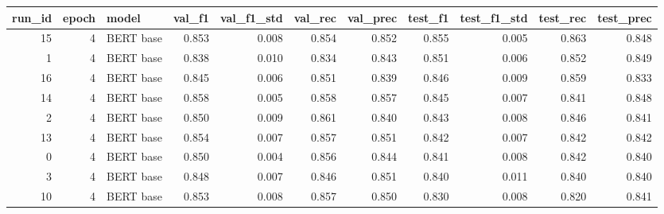 \begin{tabular}{rrlrrrrrrrr}
\toprule
 run\_id &  epoch &     model &  val\_f1 &  val\_f1\_std &  val\_rec &  val\_prec &  test\_f1 &  test\_f1\_std &  test\_rec &  test\_prec \\
\midrule
     15 &      4 & BERT base &   0.853 &       0.008 &    0.854 &     0.852 &    0.855 &        0.005 &     0.863 &      0.848 \\
      1 &      4 & BERT base &   0.838 &       0.010 &    0.834 &     0.843 &    0.851 &        0.006 &     0.852 &      0.849 \\
     16 &      4 & BERT base &   0.845 &       0.006 &    0.851 &     0.839 &    0.846 &        0.009 &     0.859 &      0.833 \\
     14 &      4 & BERT base &   0.858 &       0.005 &    0.858 &     0.857 &    0.845 &        0.007 &     0.841 &      0.848 \\
      2 &      4 & BERT base &   0.850 &       0.009 &    0.861 &     0.840 &    0.843 &        0.008 &     0.846 &      0.841 \\
     13 &      4 & BERT base &   0.854 &       0.007 &    0.857 &     0.851 &    0.842 &        0.007 &     0.842 &      0.842 \\
      0 &      4 & BERT base &   0.850 &       0.004 &    0.856 &     0.844 &    0.841 &        0.008 &     0.842 &      0.840 \\
      3 &      4 & BERT base &   0.848 &       0.007 &    0.846 &     0.851 &    0.840 &        0.011 &     0.840 &      0.840 \\
     10 &      4 & BERT base &   0.853 &       0.008 &    0.857 &     0.850 &    0.830 &        0.008 &     0.820 &      0.841 \\
\bottomrule
\end{tabular}
